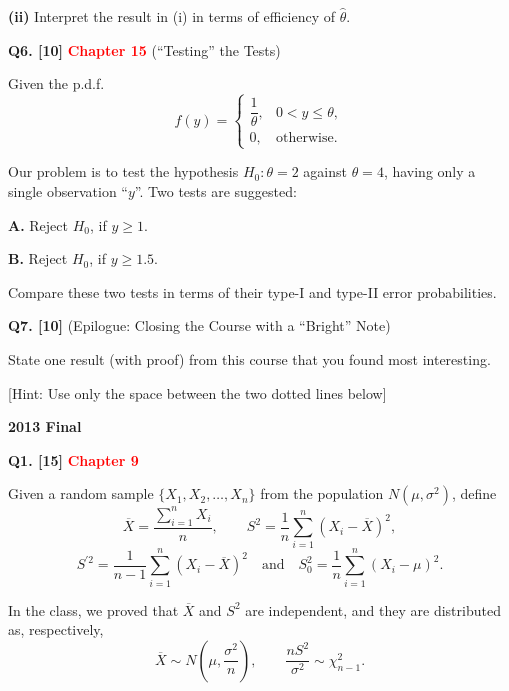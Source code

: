 \documentclass[11pt]{article}
\begin{document}
\textbf{(ii)} Interpret the result in (i) in terms of efficiency of $\hat\theta$.

\bigskip

\textbf{Q6. [10]} \textbf{\textcolor{red}{Chapter 15}} (``Testing'' the Tests)

Given the p.d.f.
\[
f(y)=\begin{cases}
\dfrac{1}{\theta}, & 0<y\leq\theta,\\[3pt]
0, & \text{otherwise}.
\end{cases}
\]

Our problem is to test the hypothesis $H_0:\theta=2$ against $\theta=4$, having only a single observation ``$y$''. Two tests are suggested:

\textbf{A.} Reject $H_0$, if $y\geq 1$.

\textbf{B.} Reject $H_0$, if $y\geq 1.5$.

Compare these two tests in terms of their type-I and type-II error probabilities.

\bigskip

\textbf{Q7. [10]} (Epilogue: Closing the Course with a ``Bright'' Note)

State one result (with proof) from this course that you found most interesting.

[Hint: Use only the space between the two dotted lines below]


\clearpage

\begin{center}
    {\Large\bfseries 2013 Final}
\end{center}

\vspace{1em}

\textbf{Q1. [15]} \textbf{\textcolor{red}{Chapter 9}}

Given a random sample $\{X_1,X_2,\ldots,X_n\}$ from the population $N(\mu,\sigma^2)$, define
\[
\overline X=\frac{\sum_{i=1}^n X_i}{n}, \qquad
S^2=\frac{1}{n}\sum_{i=1}^n(X_i-\overline X)^2,
\]
\[
S^{\prime 2}=\frac{1}{n-1}\sum_{i=1}^n(X_i-\overline X)^2
\quad\text{and}\quad
S_0^2=\frac{1}{n}\sum_{i=1}^n(X_i-\mu)^2.
\]

In the class, we proved that $\overline X$ and $S^2$ are independent, and they are distributed as, respectively,
\[
\overline X\sim N\!\left(\mu,\frac{\sigma^2}{n}\right),
\qquad \frac{nS^2}{\sigma^2}\sim\chi^2_{n-1}.
\]
\end{document}
